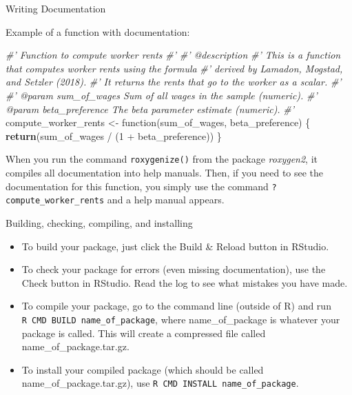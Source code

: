 \documentclass[10pt,ignorenonframetext,]{beamer}
\newenvironment{Shaded}{\begin{snugshade}}{\end{snugshade}}
\newcommand{\KeywordTok}[1]{\textcolor[rgb]{0.13,0.29,0.53}{\textbf{{#1}}}}
\newcommand{\DecValTok}[1]{\textcolor[rgb]{0.00,0.00,0.81}{{#1}}}
\newcommand{\StringTok}[1]{\textcolor[rgb]{0.31,0.60,0.02}{{#1}}}
\newcommand{\CommentTok}[1]{\textcolor[rgb]{0.56,0.35,0.01}{\textit{{#1}}}}
\newcommand{\NormalTok}[1]{{#1}}
\providecommand{\tightlist}{%
\setlength{\itemsep}{0pt}\setlength{\parskip}{0pt}}
\begin{document}
\begin{frame}[fragile]{Writing Documentation}

Example of a function with documentation:

\footnotesize

\begin{Shaded}
\begin{Highlighting}[]
\CommentTok{#' Function to compute worker rents}
\CommentTok{#'}
\CommentTok{#' @description}
\CommentTok{#' This is a function that computes worker rents using the formula}
\CommentTok{#'  derived by Lamadon, Mogstad, and Setzler (2018).}
\CommentTok{#'  It returns the rents that go to the worker as a scalar.}
\CommentTok{#'   }
\CommentTok{#' @param sum_of_wages Sum of all wages in the sample (numeric).}
\CommentTok{#' @param beta_preference The beta parameter estimate (numeric).}
\CommentTok{#' }
\NormalTok{compute_worker_rents <-}\StringTok{ }\NormalTok{function(sum_of_wages, beta_preference) \{}
  \KeywordTok{return}\NormalTok{(sum_of_wages /}\StringTok{ }\NormalTok{(}\DecValTok{1} \NormalTok{+}\StringTok{ }\NormalTok{beta_preference))}
\NormalTok{\}}
\end{Highlighting}
\end{Shaded}

\normalsize

When you run the command \texttt{roxygenize()} from the package
\emph{roxygen2}, it compiles all documentation into help manuals. Then,
if you need to see the documentation for this function, you simply use
the command \texttt{?compute\_worker\_rents} and a help manual appears.

\end{frame}

\begin{frame}[fragile]{Building, checking, compiling, and installing}

\begin{itemize}
\tightlist
\item
  To build your package, just click the Build \& Reload button in
  RStudio.
\item
  To check your package for errors (even missing documentation), use the
  Check button in RStudio. Read the log to see what mistakes you have
  made.
\item
  To compile your package, go to the command line (outside of R) and run
  \texttt{R\ CMD\ BUILD\ name\_of\_package}, where name\_of\_package is
  whatever your package is called. This will create a compressed file
  called name\_of\_package.tar.gz.
\item
  To install your compiled package (which should be called
  name\_of\_package.tar.gz), use
  \texttt{R\ CMD\ INSTALL\ name\_of\_package}.
\end{itemize}

\end{frame}
\end{document}
